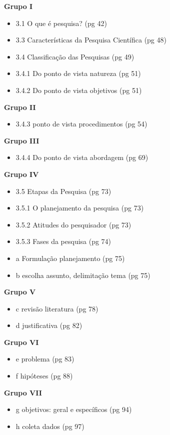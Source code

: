 \documentclass[a4paper]{article}
\begin{document}
\begin{multicols}{2}
{\bf Grupo I}

\begin{itemize}
\item 3.1 O que é pesquisa? (pg 42)
\item 3.3 Características da Pesquisa Científica (pg 48)
\item 3.4 Classificação das Pesquisas (pg 49)
\item 3.4.1 Do ponto de vista natureza (pg 51)
\item 3.4.2 Do ponto de vista  objetivos (pg 51)
\end{itemize}

{\bf Grupo II}
\begin{itemize}
\item 3.4.3  ponto de vista  procedimentos (pg 54)
\end{itemize}

{\bf Grupo III}
\begin{itemize}
\item 3.4.4 Do ponto de vista  abordagem (pg 69)
\end{itemize}

{\bf Grupo IV}
\begin{itemize}
\item 3.5 Etapas da Pesquisa (pg 73)
\item 3.5.1 O planejamento da pesquisa (pg 73)
\item 3.5.2 Atitudes do pesquisador (pg 73)
\item 3.5.3 Fases da pesquisa (pg 74)
\item a Formulação planejamento  (pg 75)
\item b escolha assunto, delimitação tema (pg 75)
\end{itemize}

{\bf Grupo V}

\begin{itemize}
\item c revisão literatura (pg 78)
\item d justificativa (pg 82)
\end{itemize}

\columnbreak

{\bf Grupo VI}
\begin{itemize}
\item e problema (pg 83)
\item f hipóteses (pg 88)
\end{itemize}

{\bf Grupo VII}
\begin{itemize}
\item g objetivos: geral e específicos (pg 94)
\item h coleta dados (pg 97)
\end{itemize}


\end{multicols}
\end{document}
